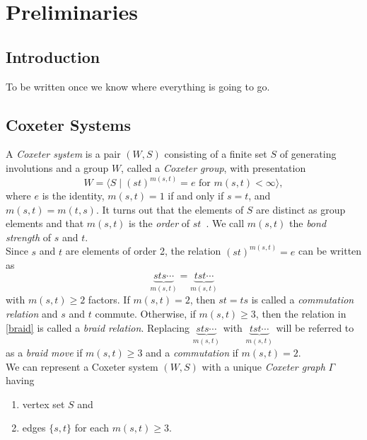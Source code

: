 \chapter{Preliminaries}

\section{Introduction}
To be written once we know where everything is going to go.


\section{Coxeter Systems}\label{sec:coxeter}
A \emph{Coxeter system} is a pair $(W,S)$ consisting of a finite set $S$ of generating involutions and a group $W$, called a \emph{Coxeter group}, with presentation 
\[ 
W = \langle S \mid (st)^{m(s, t)} = e \text{ for } m(s, t) < \infty \rangle,
\]
where $e$ is the identity, $m(s,t) = 1$ if and only if $s = t$, and $m(s,t) = m(t,s)$. It turns out that the elements of $S$ are distinct as group elements and that $m(s,t)$ is the \emph\emph{order} of $st$~\cite{Humphreys1990}. We call $m(s,t)$ the \emph{bond strength} of $s$ and $t$.\\

Since $s$ and $t$ are elements of order 2, the relation $(st)^{m(s,t)}=e$ can be written as
\begin{equation}\label{braid} 
	\underbrace{sts \cdots}_{m(s,t)}=\underbrace{tst\cdots}_{m(s,t)}
\end{equation}
with $m(s,t) \geq 2$ factors. If $m(s,t)=2$, then $st=ts$ is called a \emph{commutation relation} and $s$ and $t$ commute. Otherwise, if $m(s,t) \geq 3$, then the relation in \eqref{braid} is called a \emph{braid relation}. Replacing $\underbrace{sts\cdots}_{m(s,t)}$ with $\underbrace{tst\cdots}_{m(s,t)}$ will be referred to as a \emph{braid move} if $m(s,t) \geq 3$ and a \emph{commutation} if $m(s,t)=2$.\\

We can represent a Coxeter system $(W,S)$ with a unique \emph{Coxeter graph} $\Gamma$ having
\begin{enumerate}
\item vertex set $S$ and
\item edges $\{s, t\}$ for each $m(s,t) \geq 3$.	
\end{enumerate}

